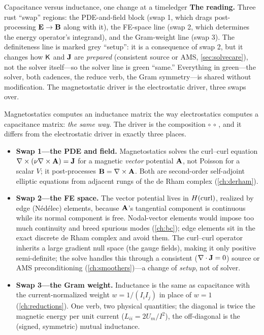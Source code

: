 \begin{workedexample}{Capacitance versus inductance, one change at a time}{ledger}
\textbf{The reading.} Three rust ``swap'' regions: the PDE-and-field block (swap 1,
which drags post-processing $\mathbf{E}\to\mathbf{B}$ along with it), the FE-space line (swap 2,
which determines the energy operator's integrand), and the Gram-weight line (swap
3). The definiteness line is marked grey ``setup'': it is a consequence of swap 2,
but it changes how $\mathsf{K}$ and $\mathbf{J}$ are \emph{prepared} (consistent source or AMS,
\cref{sec:solvecare}), not the solver itself---so the solver line is green
``same.'' Everything in green---the solver, both cadences, the reduce verb, the Gram
symmetry---is shared without modification. The magnetostatic driver is the
electrostatic driver, three swaps over.
\end{workedexample}

\summarysection

Magnetostatics computes an inductance matrix the way electrostatics computes a
capacitance matrix: \emph{the same way}. The driver is the composition
 $\circ$  $\circ$ , and it
differs from the electrostatic driver in exactly three places.

\begin{itemize}[nosep]
\item \textbf{Swap 1---the PDE and field.} Magnetostatics solves the curl--curl
  equation $\nabla\times(\nu\nabla\times\mathbf{A})=\mathbf{J}$ for a magnetic \emph{vector} potential $\mathbf{A}$,
  not Poisson for a scalar $V$; it post-processes $\mathbf{B}=\nabla\times\mathbf{A}$. Both are
  second-order self-adjoint elliptic equations from adjacent rungs of the de Rham
  complex (\cref{ch:derham}).
\item \textbf{Swap 2---the FE space.} The vector potential lives in $H(\mathrm{curl})$,
  realized by edge (N\'ed\'elec) elements, because $\mathbf{A}$'s tangential component is
  continuous while its normal component is free. Nodal-vector elements would impose
  too much continuity and breed spurious modes (\cref{ch:bc}); edge elements sit in
  the exact discrete de Rham complex and avoid them. The curl--curl operator
  inherits a large gradient null space (the gauge fields), making it only positive
  semi-definite; the solve handles this through a consistent ($\nabla\cdot\mathbf{J}=0$) source or
  AMS preconditioning (\cref{ch:smoothers})---a change of \emph{setup}, not of
  solver.
\item \textbf{Swap 3---the Gram weight.} Inductance is the same 
  as capacitance with the current-normalized weight $w=1/(I_iI_j)$ in place of
  $w=1$ (\cref{ch:reductions}). One verb, two physical quantities; the diagonal is
  twice the magnetic energy per unit current ($L_{ii}=2U_m/I^2$), the off-diagonal
  is the (signed, symmetric) mutual inductance.
\end{itemize}

